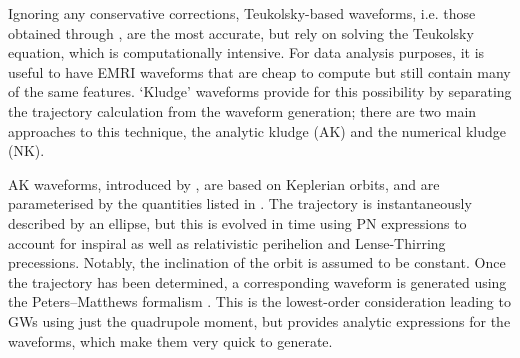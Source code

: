 Ignoring any conservative corrections, Teukolsky-based waveforms, i.e. those obtained through , are the most accurate, but rely on solving the Teukolsky equation, which is computationally intensive. For data analysis purposes, it is useful to have EMRI waveforms that are cheap to compute but still contain many of the same features. `Kludge' waveforms provide for this possibility by separating the trajectory calculation from the waveform generation; there are two main approaches to this technique, the analytic kludge (AK) and the numerical kludge (NK).

AK waveforms, introduced by \citet{barack_lisa_2004}, are based on Keplerian orbits, and are parameterised by the quantities listed in . The trajectory is instantaneously described by an ellipse, but this is evolved in time using PN expressions to account for inspiral as well as relativistic perihelion and Lense-Thirring precessions. Notably, the inclination of the orbit is assumed to be constant. Once the trajectory has been determined, a corresponding waveform is generated using the Peters--Matthews formalism \citep{peters_gravitational_1963, peters_gravitational_1964}. This is the lowest-order consideration leading to GWs using just the quadrupole moment, but provides analytic expressions for the waveforms, which make them very quick to generate.

